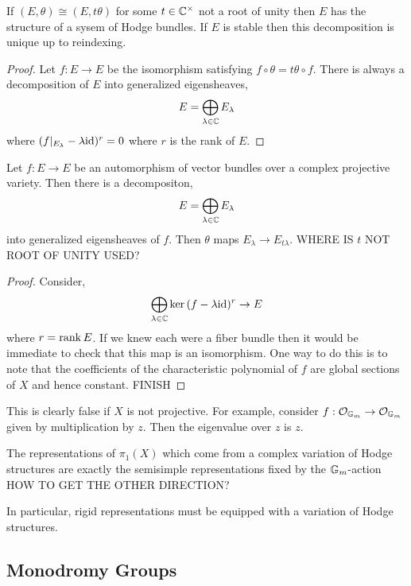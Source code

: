 \documentclass[12pt]{article}
\begin{document}
\begin{lemma}
If $(E, \theta) \cong (E, t \theta)$ for some $t \in \mathbb{C}^\times$ not a root of unity then $E$ has the structure of a sysem of Hodge bundles. If $E$ is stable then this decomposition is unique up to reindexing.
\end{lemma}

\begin{proof}
Let $f : E \to E$ be the isomorphism satisfying $f \circ \theta = t \theta \circ f$. There is always a decomposition of $E$ into generalized eigensheaves,
\[ E = \bigoplus_{\lambda \in \mathbb{C}} E_{\lambda} \]
where $(f|_{E_\lambda} - \lambda \mathrm{id})^r = 0$ where $r$ is the rank of $E$.  
\end{proof}

\begin{lemma}
Let $f : E \to E$ be an automorphism of vector bundles over a complex projective variety. Then there is a decompositon,
\[ E = \bigoplus_{\lambda \in \mathbb{C}} E_\lambda \]
into generalized eigensheaves of $f$. Then $\theta$ maps $E_\lambda \to E_{t \lambda}$. {\color{red} WHERE IS $t$ NOT ROOT OF UNITY USED?}
\end{lemma}

\begin{proof}
Consider,
\[ \bigoplus_{\lambda \in \mathbb{C}} \ker{(f - \lambda \mathrm{id})^r} \to E \]
where $r = \operatorname{\mathrm{rank}}{E}$. If we knew each were a fiber bundle then it would be immediate to check that this map is an isomorphism. One way to do this is to note that the coefficients of the characteristic polynomial of $f$ are global sections of $X$ and hence constant. {\color{red} FINISH}
\end{proof}

\begin{rmk}
This is clearly false if $X$ is not projective. For example, consider $f : \mathcal{O}_{\mathbb{G}_m} \to \mathcal{O}_{\mathbb{G}_m}$ given by multiplication by $z$. Then the eigenvalue over $z$ is $z$. 
\end{rmk}

\begin{cor}
The representations of $\pi_1(X)$ which come from a complex variation of Hodge structures are exactly the semisimple representations fixed by the $\mathbb{G}_m$-action {\color{red} HOW TO GET THE OTHER DIRECTION?}
\end{cor}

In particular, rigid representations must be equipped with a variation of Hodge structures. 

\subsection{Monodromy Groups}
\end{document}
